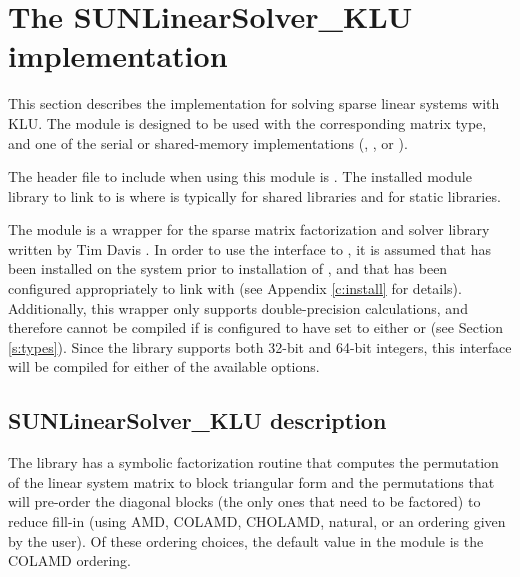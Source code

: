 \section{The SUNLinearSolver\_KLU implementation}
\label{ss:sunlinsol_klu}

This section describes the {\sunlinsol} implementation for solving sparse linear
systems with KLU. The {\sunlinsolklu} module is designed to be used with the
corresponding {\sunmatsparse} matrix type, and one of the serial or
shared-memory {\nvector} implementations ({\nvecs}, {\nvecopenmp}, or
{\nvecpthreads}).

The header file to include when using this module 
is . The installed module
library to link to is
where  is typically  for shared libraries and
 for static libraries.

The {\sunlinsolklu} module is a {\sunlinsol} wrapper for
the {\klu} sparse matrix factorization and solver library written by Tim
Davis \cite{KLU_site,DaPa:10}.  In order to use the
{\sunlinsolklu} interface to {\klu}, it is assumed that {\klu} has
been installed on the system prior to installation of {\sundials}, and
that {\sundials} has been configured appropriately to link with {\klu}
(see Appendix \ref{c:install} for details).  Additionally, this
wrapper only supports double-precision calculations, and therefore
cannot be compiled if {\sundials} is configured to have 
set to either  or  (see Section \ref{s:types}).
Since the {\klu} library supports both 32-bit and 64-bit integers, this
interface will be compiled for either of the available 
options. {\warn}

\subsection{SUNLinearSolver\_KLU description}
\label{ss:sunlinsol_klu_description}

The {\klu} library has a symbolic factorization routine that computes
the permutation of the linear system matrix to block triangular form
and the permutations that will pre-order the diagonal blocks (the only
ones that need to be factored) to reduce fill-in (using AMD, COLAMD,
CHOLAMD, natural, or an ordering given by the user).  Of these
ordering choices, the default value in the {\sunlinsolklu} 
module is the COLAMD ordering.

